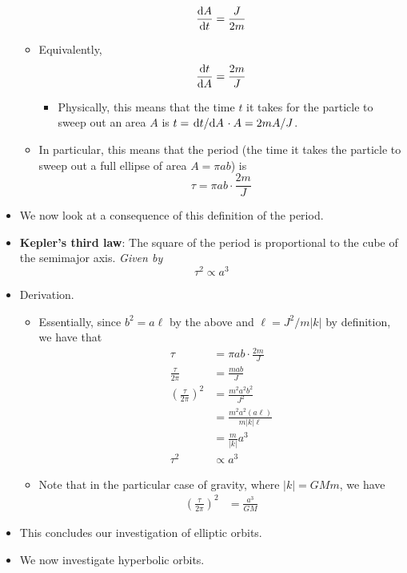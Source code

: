 \documentclass[../notes.tex]{subfiles}
\begin{document}
\begin{itemize}
\begin{itemize}
\begin{equation*}
            \dv{A}{t} = \frac{J}{2m}
        \end{equation*}
        \item Equivalently,
        \begin{equation*}
            \dv{t}{A} = \frac{2m}{J}
        \end{equation*}
        \begin{itemize}
            \item Physically, this means that the time $t$ it takes for the particle to sweep out an area $A$ is $t=\dv*{t}{A}\cdot A=2mA/J$.
        \end{itemize}
        \item In particular, this means that the period (the time it takes the particle to sweep out a full ellipse of area $A=\pi ab$) is
        \begin{equation*}
            \tau = \pi ab\cdot\frac{2m}{J}
        \end{equation*}
    \end{itemize}
    \item We now look at a consequence of this definition of the period.
    \item \textbf{Kepler's third law}: The square of the period is proportional to the cube of the semimajor axis. \emph{Given by}
    \begin{equation*}
        \tau^2 \propto a^3
    \end{equation*}
    \item Derivation.
    \begin{itemize}
        \item Essentially, since $b^2=a\ell$ by the above and $\ell=J^2/m|k|$ by definition, we have that
        \begin{align*}
            \tau &= \pi ab\cdot\frac{2m}{J}\\
            \frac{\tau}{2\pi} &= \frac{mab}{J}\\
            \left( \frac{\tau}{2\pi} \right)^2 &= \frac{m^2a^2b^2}{J^2}\\
            &= \frac{m^2a^2(a\ell)}{m|k|\ell}\\
            &= \frac{m}{|k|}a^3\\
            \tau^2 &\propto a^3
        \end{align*}
        \item Note that in the particular case of gravity, where $|k|=GMm$, we have
        \begin{align*}
            \left( \frac{\tau}{2\pi} \right)^2 &= \frac{a^3}{GM}
        \end{align*}
    \end{itemize}
    \item This concludes our investigation of elliptic orbits.
    \item We now investigate hyperbolic orbits.
    \begin{figure}[h!]
        \centering
\end{figure}
\end{itemize}
\end{document}
